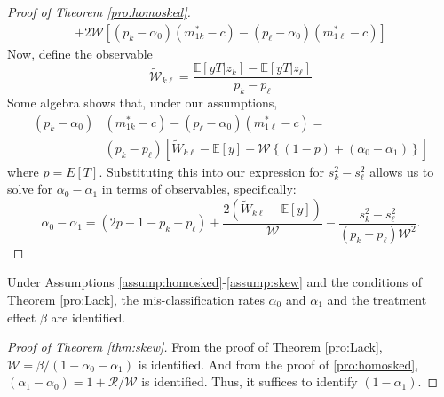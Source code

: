 \begin{proof}[Proof of Theorem \ref{pro:homosked}]
\begin{align*}
  + 2\mathcal{W}\left[(p_k - \alpha_0)(m^*_{1k}-c) - (p_\ell - \alpha_0)(m^*_{1\ell}-c)\right]
\end{align*}
Now, define the observable
\begin{equation*}
  \widetilde{\mathcal{W}}_{k\ell} = \frac{\mathbb{E}[yT|z_k] - \mathbb{E}[yT|z_\ell]}{p_k - p_\ell}
\end{equation*}
Some algebra shows that, under our assumptions,
\begin{align*}
(p_k - \alpha_0)&(m^*_{1k}-c) - (p_\ell - \alpha_0)(m^*_{1\ell}-c) =\\
& (p_k - p_\ell)\left[ \widetilde{W}_{k\ell} - \mathbb{E}[y] - \mathcal{W}\left\{ (1 - p) + (\alpha_0 - \alpha_1) \right\} \right]
\end{align*}
where $p = E[T]$.
Substituting this into our expression for $s_k^2 - s_\ell^2$ allows us to solve for $\alpha_0 - \alpha_1$ in terms of observables, specifically:
\begin{equation*}
  \alpha_0 - \alpha_1 = (2p - 1 - p_k - p_\ell) + \frac{2(\widetilde{W}_{k\ell} - \mathbb{E}[y])}{\mathcal{W}} - \frac{s_k^2 - s_\ell^2}{(p_k - p_\ell)\mathcal{W}^2}.
\end{equation*}
\end{proof}

\begin{thm}
  \label{thm:skew}
  Under Assumptions \ref{assump:homosked}-\ref{assump:skew} and the conditions of Theorem \ref{pro:Lack}, the mis-classification rates $\alpha_0$ and $\alpha_1$ and the treatment effect $\beta$ are identified.
\end{thm}

\begin{proof}[Proof of Theorem \ref{thm:skew}]
  From the proof of Theorem \ref{pro:Lack}, $\mathcal{W} = \beta/(1-\alpha_0 - \alpha_1)$ is identified. 
  And from the proof of \ref{pro:homosked}, $(\alpha_1 - \alpha_0) = 1 + \mathcal{R}/\mathcal{W}$ is identified.
  Thus, it suffices to identify $(1-\alpha_1)$. 
\end{proof}
